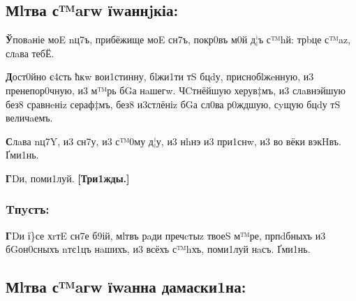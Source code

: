 \subsection{Мlтва с™aгw їwаннjкіа:}

\textbf{Ў}повaніе моE nц7ъ, прибёжище моE сн7ъ, покр0въ м0й д¦ъ с™hй: трbце с™az,
слaва тебЁ.

\textbf{Д}ост0йно є4сть ћкw вои1стинну, бlжи1ти тS бцdу, приснобlжeнную, и3
пренепор0чную, и3 м™рь бGа нaшегw. ЧCтнёйшую херув‡мъ, и3 слaвнэйшую
без8 сравнeніz сераф‡мъ, без8 и3стлёніz бGа сл0ва р0ждшую, сyщую бцdу тS
величaемъ.

\textbf{С}лaва nц7Y, и3 сн7у, и3 с™0му д¦у, и3 нhнэ и3 при1снw, и3 во вёки
вэкHвъ. Ґми1нь.

\textbf{Г}Dи, поми1луй. \textbf{{[}Три1жды.{]}}

\subsubsection{Tпyстъ:}

\textbf{Г}Dи ї\}се хrтE сн7е б9ій, мlтвъ рaди пречcтыz твоеS м™ре, прпdбныхъ и3
бGон0сныхъ nтє1цъ нaшихъ, и3 всёхъ с™hхъ, поми1луй нaсъ. Ґми1нь.

\subsection{Мlтва с™aгw їwaнна дамаски1на:}

